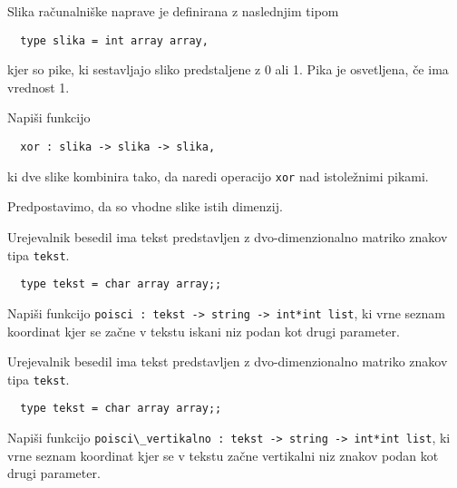 \begin{ex}
  Slika ra\v cunalni\v ske naprave je definirana z naslednjim tipom

  \begin{lstlisting}
  type slika = int array array,
  \end{lstlisting}

  kjer so pike, ki sestavljajo sliko predstaljene z 0 ali 1. Pika je
  osvetljena, \v ce ima vrednost 1.

  Napi\v si funkcijo

  \begin{lstlisting}
  xor : slika -> slika -> slika,
  \end{lstlisting}

  ki dve slike kombinira tako, da naredi operacijo \lstinline{xor} nad
  istole\v znimi pikami.

  Predpostavimo, da so vhodne slike istih dimenzij.


\end{ex} 
\begin{ex}
  Urejevalnik besedil ima tekst predstavljen z dvo-dimenzionalno
  matriko znakov tipa \lstinline{tekst}.

  \begin{lstlisting}
  type tekst = char array array;;
  \end{lstlisting}
  Napi\v si funkcijo 
  \lstinline{poisci : tekst -> string -> int*int list}, 
  ki vrne seznam koordinat kjer se 
  za\v cne v tekstu iskani niz
  podan kot drugi parameter. 


\end{ex} 
\begin{ex}
  Urejevalnik besedil ima tekst predstavljen z dvo-dimenzionalno
  matriko znakov tipa \lstinline{tekst}.

  \begin{lstlisting}
  type tekst = char array array;;
  \end{lstlisting}

  Napi\v si funkcijo 
  \lstinline{poisci\_vertikalno : tekst -> string -> int*int list}, 
  ki vrne seznam koordinat kjer se v tekstu za\v cne
  vertikalni niz znakov podan kot drugi parameter.


\end{ex} 
